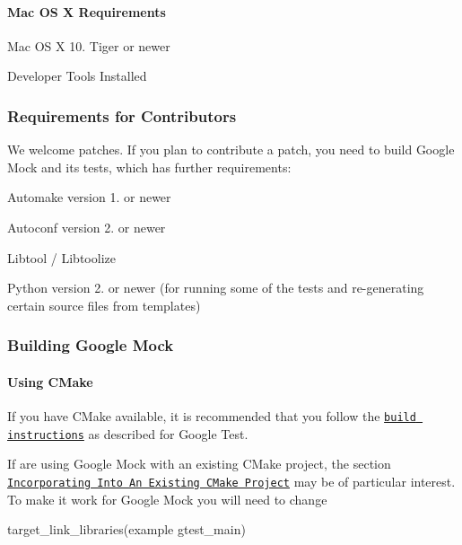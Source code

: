 \paragraph*{Mac OS X Requirements}


\begin{DoxyItemize}
\item Mac OS X 10. Tiger or newer
\item Developer Tools Installed
\end{DoxyItemize}

\subsubsection*{Requirements for Contributors}

We welcome patches. If you plan to contribute a patch, you need to build Google Mock and its tests, which has further requirements\+:


\begin{DoxyItemize}
\item Automake version 1. or newer
\item Autoconf version 2. or newer
\item Libtool / Libtoolize
\item Python version 2. or newer (for running some of the tests and re-\/generating certain source files from templates)
\end{DoxyItemize}

\subsubsection*{Building Google Mock}

\paragraph*{Using C\+Make}

If you have C\+Make available, it is recommended that you follow the \href{../googletest/README.md#using-cmake}{\tt build instructions} as described for Google Test.

If are using Google Mock with an existing C\+Make project, the section \href{../googletest/README.md#incorporating-into-an-existing-cmake-project}{\tt Incorporating Into An Existing C\+Make Project} may be of particular interest. To make it work for Google Mock you will need to change \begin{DoxyVerb}target_link_libraries(example gtest_main)
\end{DoxyVerb}


